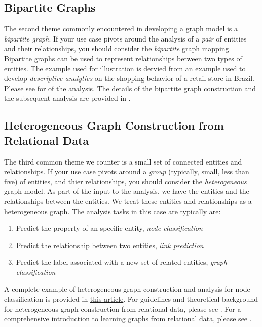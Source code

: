 \documentclass{article}
\begin{document}
\subsection{Bipartite Graphs}

The second theme commonly encountered in developing a graph model is a \emph{bipartite graph}. If your use case pivots around the analysis of a \emph{pair} of entities and their relationships, you should consider the \emph{bipartite} graph mapping. Bipartite graphs can be used to represent relationships between two types of entities. The example used for illustration is dervied from an example used to develop \emph{descriptive analytics} on the shopping behavior of a retail store in Brazil. Please see \href{https://github.com/rajivsam/descriptive_analytics/blob/main/examples/olist_case_study/picture_summary_SP_2017.md}{\cite{olistDescriptiveAnalytics}} for of the analysis. The details of the bipartite graph construction and the subsequent analysis are provided in \href{https://github.com/rajivsam/descriptive_analytics/blob/main/examples/olist_case_study/temporal_coclustering_SP_2017.pdf}{\cite{coclusteringOlist2017}}.

\subsection{Heterogeneous Graph Construction from Relational Data} 

The third common theme we counter is a small set of connected entities and relationships. If your use case pivots around a \emph{group} (typically, small, less than five) of entities, and thier relationships, you should consider the \emph{heterogeneous} graph model. As part of the input to the analysis, we have the entities and the relationships between the entities. We treat these entities and relationships as a heterogeneous graph. The analysis tasks in this case are typically are:
\begin{enumerate}
    \item Predict the property of an specific entity, \emph{node classification}
    \item Predict the relationship between two entities, \emph{link prediction}
    \item Predict the label associated with a new set of related entities, \emph{graph classification}
\end{enumerate}

A complete example of heterogeneous graph construction and analysis for node classification is provided in \href{https://www.sciencedirect.com/science/article/pii/S2666827021001195}{this article}\cite{helpdeskgcnsambasivan2022predicting}. For guidelines and theoretical background for heterogeneous graph construction from relational data, please see \cite{schlichtkrull2018modeling}. For a comprehensive introduction to learning graphs from relational data, please see \cite{getoor2007introduction}.
\end{document}
